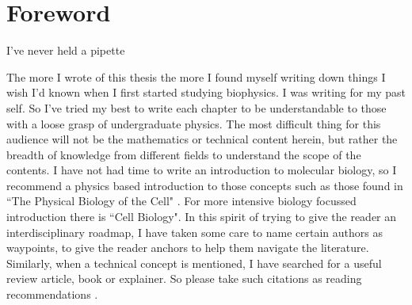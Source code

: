 \chapter*{Foreword}
\label{chap:foreword}
\begin{chapquote} {}
I've never held a pipette
\end{chapquote}

The more I wrote of this thesis the more I found myself writing down things I wish I'd known when I first started studying biophysics. I was writing for my past self. So I've tried my best to write each chapter to be understandable to those with a loose grasp of undergraduate physics. The most difficult thing for this audience will not be the mathematics or technical content herein, but rather the breadth of knowledge from different fields to understand the scope of the contents. I have not had time to write an introduction to molecular biology, so I recommend a physics based introduction to those concepts such as those found in ``The Physical Biology of the Cell" \cite{phillips2012}. For more intensive biology focussed introduction there is ``Cell Biology"\cite{pollard2016}. In this spirit of trying to give the reader an interdisciplinary roadmap, I have taken some care to name certain authors as waypoints, to give the reader anchors to help them navigate the literature. Similarly, when a technical concept is mentioned, I have searched for a useful review article, book or explainer. So please take such citations as reading recommendations \cite{dawkins1989, hofstadter1999}.

